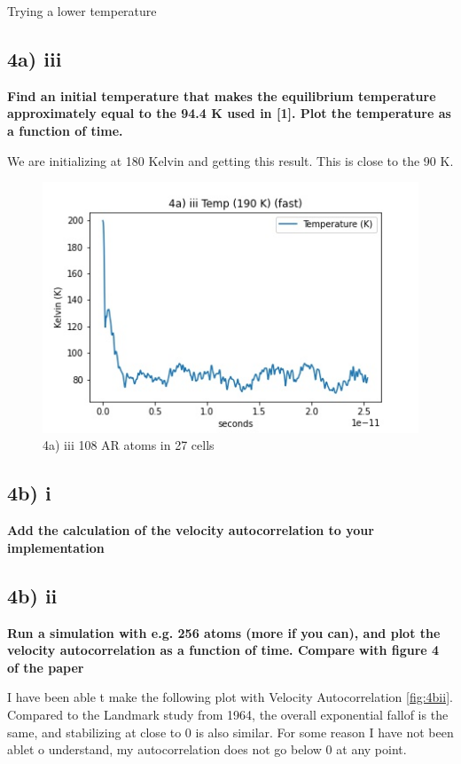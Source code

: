\documentclass[a4paper,10pt,english]{article}
\begin{document}
Trying a lower temperature

\subsection*{4a) iii }
\textbf{Find an initial temperature that makes the equilibrium temperature approximately equal to the
94.4 K used in [1]. Plot the temperature as a function of time.
}


We are initializing at 180 Kelvin and getting this result. This is close to the 90 K. 
\begin{figure}[h!]
        \centering 
        \includegraphics[scale=0.6]{./py/4a_iii_fast.jpg} 
        \caption{4a) iii 108 AR atoms in 27 cells  }
        \label{fig:3biv}
\end{figure}


\subsection*{4b) i}
\textbf{Add the calculation of the velocity autocorrelation to your implementation}

\newpage
\subsection*{4b) ii}
\textbf{Run a simulation with e.g. 256 atoms (more if you can), and plot the velocity autocorrelation as
a function of time. Compare with figure 4 of the paper}

I have been able t make the following plot with Velocity Autocorrelation \ref{fig:4bii}. Compared to the Landmark study from 1964, the overall exponential fallof is the same, and stabilizing at close to 0 is also similar. For some reason I have not been ablet o understand, my autocorrelation does not go below 0 at any point.
\end{document}

